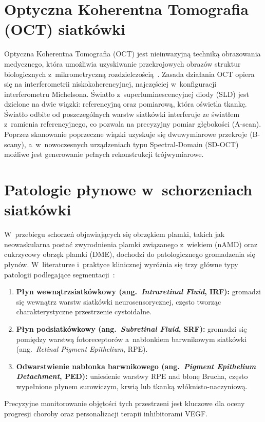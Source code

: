 \documentclass[12pt,a4paper,oneside]{report}
\begin{document}
\section{Optyczna Koherentna Tomografia (OCT) siatkówki}

Optyczna Koherentna Tomografia (OCT) jest nieinwazyjną techniką obrazowania medycznego, która umożliwia uzyskiwanie przekrojowych obrazów struktur biologicznych z~mikrometryczną rozdzielczością~\cite{huang1991oct}. Zasada działania OCT opiera się na interferometrii niskokoherencyjnej, najczęściej w~konfiguracji interferometru Michelsona. Światło z~superluminescencyjnej diody (SLD) jest dzielone na dwie wiązki: referencyjną oraz pomiarową, która oświetla tkankę. Światło odbite od poszczególnych warstw siatkówki interferuje ze światłem z~ramienia referencyjnego, co pozwala na precyzyjny pomiar głębokości (A-scan). Poprzez skanowanie poprzeczne wiązki uzyskuje się dwuwymiarowe przekroje (B-scany), a~w~nowoczesnych urządzeniach typu Spectral-Domain (SD-OCT) możliwe jest generowanie pełnych rekonstrukcji trójwymiarowe.

\section{Patologie płynowe w~schorzeniach siatkówki}

W~przebiegu schorzeń objawiających się obrzękiem plamki, takich jak neowaskularna postać zwyrodnienia plamki związanego z~wiekiem (nAMD) oraz cukrzycowy obrzęk plamki (DME), dochodzi do patologicznego gromadzenia się płynów. W~literaturze i~praktyce klinicznej wyróżnia się trzy główne typy patologii podlegające segmentacji~\cite{retouch2019}:
\begin{enumerate}
 \item \textbf{Płyn wewnątrzsiatkówkowy (ang.~\textit{Intraretinal Fluid}, IRF):} gromadzi się wewnątrz warstw siatkówki neurosensorycznej, często tworząc charakterystyczne przestrzenie cystoidalne.
 \item \textbf{Płyn podsiatkówkowy (ang.~\textit{Subretinal Fluid}, SRF):} gromadzi się pomiędzy warstwą fotoreceptorów a~nabłonkiem barwnikowym siatkówki (ang.~\textit{Retinal Pigment Epithelium}, RPE).
 \item \textbf{Odwarstwienie nabłonka barwnikowego (ang.~\textit{Pigment Epithelium Detachment}, PED):} uniesienie warstwy RPE nad błonę Brucha, często wypełnione płynem surowiczym, krwią lub tkanką włóknisto-naczyniową.
\end{enumerate}
Precyzyjne monitorowanie objętości tych przestrzeni jest kluczowe dla oceny progresji choroby oraz personalizacji terapii inhibitorami VEGF.\@
\end{document}
